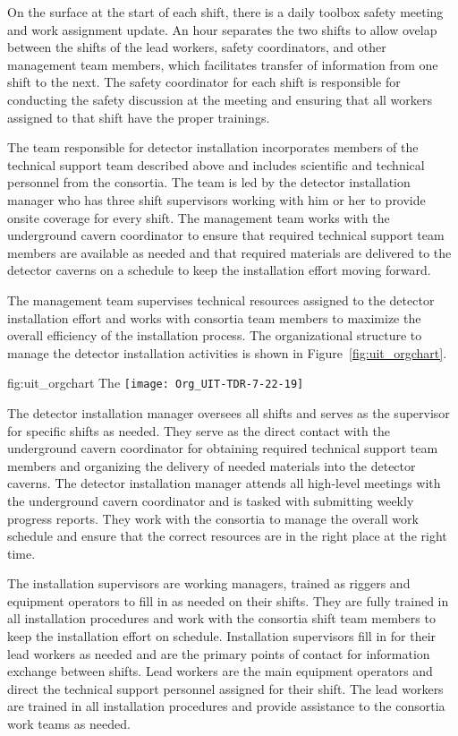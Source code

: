 On the surface at the start of each shift, there is a daily 
toolbox safety meeting and work assignment update. An hour 
separates the two shifts to allow ovelap between the shifts 
of the lead workers, safety coordinators, and other management 
team members, which facilitates transfer of information 
from one shift to the next. The safety coordinator for each shift 
is responsible for conducting the safety discussion at the 
meeting and ensuring that all workers assigned to that shift 
have the proper trainings.

The team responsible for detector installation incorporates 
members of the technical support team described above 
and includes scientific and technical personnel from 
the  consortia.  The team is led by the detector
installation manager who has three shift supervisors working 
with him or her to provide onsite coverage for every shift.
The management team works with the underground cavern
coordinator to ensure that required technical support team 
members are available as needed and that required materials 
are delivered to the detector caverns on a schedule to keep
the installation effort moving forward.         

The management team supervises technical resources assigned to 
the detector installation effort and works with consortia 
team members to maximize the overall efficiency of the installation 
process.  The organizational structure to manage the detector 
installation activities is shown in Figure~\ref{fig:uit_orgchart}.
\begin{dunefigure}{fig:uit_orgchart}
  {The }
  \texttt{[image: Org\_UIT-TDR-7-22-19]}
\end{dunefigure}

The detector installation manager oversees all shifts and serves as
the supervisor for specific shifts as needed.  They serve as the
direct contact with the underground cavern coordinator for obtaining
required technical support team members and organizing the delivery of
needed materials into the detector caverns.  The detector installation
manager attends all high-level meetings with the underground cavern
coordinator and is tasked with submitting weekly progress reports.
They work with the  consortia to manage the overall work
schedule and ensure that the correct resources are in the right place
at the right time.
    
The installation supervisors are working managers, trained as 
riggers and equipment operators to fill in as needed on their 
shifts.  They are fully trained in all installation procedures
and work with the consortia shift team members to keep the 
installation effort on schedule.  Installation supervisors 
fill in for their lead workers as needed and are the primary 
points of contact for information exchange 
between shifts.  Lead workers are the main equipment operators 
and direct the technical support personnel assigned for their 
shift.  The lead workers are trained in all installation 
procedures and provide assistance to the consortia work teams 
as needed.  


